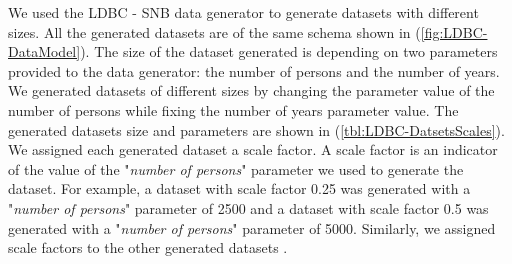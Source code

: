{We used the LDBC - SNB data generator to generate datasets with different sizes. All the generated datasets are of the same schema shown in (\ref{fig:LDBC-DataModel}). The size of the dataset generated is depending on two parameters provided to the data generator: the number of persons and the number of years. We generated datasets of different sizes by changing the parameter value of the number of persons while fixing the number of years parameter value. The generated datasets size and parameters are shown in (\ref{tbl:LDBC-DatsetsScales}). We assigned each generated dataset a scale factor. A scale factor is an indicator of the value of the "\textit{number of persons}" parameter we used to generate the dataset. For example, a dataset with scale factor 0.25 was generated with a "\textit{number of persons}" parameter of 2500 and a dataset with scale factor 0.5 was generated with a "\textit{number of persons}" parameter of 5000. Similarly, we assigned scale factors to the other generated datasets \cite{prat2017ldbc}.

\begin{table}[h]
\centering
{}
\caption{The generated datasets size and parameters}
\label{tbl:LDBC-DatsetsScales}
\end{table}

}
